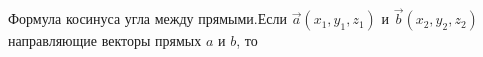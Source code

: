 \documentclass[preview]{standalone}
\begin{document}
\begin{center}
Формула косинуса угла между прямыми.Если $\vec{a}(x_1, y_1, z_1)$ и $\vec{b}(x_2, y_2, z_2)$направляющие векторы прямых $a$ и $b$, то
\end{center}
\end{document}
